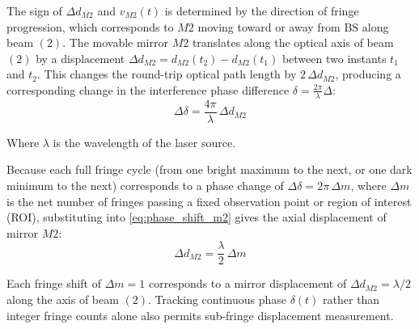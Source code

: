 The sign of $\Delta d_{M2}$ and $v_{M2}(t)$ is determined by the direction of fringe progression, which corresponds to $M2$ moving toward or away from $\text{BS}$ along beam $(2)$. The movable mirror $M2$ translates along the optical axis of beam $(2)$ by a displacement $\Delta d_{M2} = d_{M2}(t_2) - d_{M2}(t_1)$ between two instants $t_1$ and $t_2$. This changes the round-trip optical path length by $2\,\Delta d_{M2}$, producing a corresponding change in the interference phase difference $\delta = \frac{2\pi}{\lambda}\Delta$:
\begin{equation}
    \Delta\delta = \frac{4\pi}{\lambda}\,\Delta d_{M2}
    \label{eq:phase_shift_m2}
\end{equation}

Where $\lambda$ is the wavelength of the laser source.


Because each full fringe cycle (from one bright maximum to the next, or one dark minimum to the next) corresponds to a phase change of $\Delta\delta = 2\pi\,\Delta m$, where $\Delta m$ is the net number of fringes passing a fixed observation point or region of interest (ROI), substituting into \cref{eq:phase_shift_m2} gives the axial displacement of mirror $M2$:
\begin{equation}
    \Delta d_{M2} = \frac{\lambda}{2}\,\Delta m
    \label{eq:displacement_m2}
\end{equation}


Each fringe shift of $\Delta m = 1$ corresponds to a mirror displacement of $\Delta d_{M2} = \lambda/2$ along the axis of beam $(2)$. Tracking continuous phase $\delta(t)$ rather than integer fringe counts alone also permits sub-fringe displacement measurement.